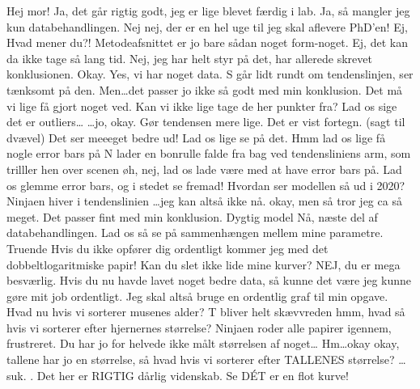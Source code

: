 \documentclass[a4paper,11pt]{article}
\begin{document}
\begin{sketch}
 Hej mor! Ja, det går rigtig godt, jeg er lige blevet færdig i lab. Ja, så mangler jeg kun databehandlingen. 
Nej nej, der er en hel uge til jeg skal aflevere PhD'en! Ej, Hvad mener du?! Metodeafsnittet er jo bare sådan noget form-noget. Ej, det kan da ikke tage så lang tid. 
Nej, jeg har helt styr på det, har allerede skrevet konklusionen.  
 Okay. Yes, vi har noget data. 
\scene S går lidt rundt om tendenslinjen, ser tænksomt på den. 
 Men\ldots det passer jo ikke så godt med min konklusion. Det må vi lige få gjort noget ved. Kan vi ikke lige tage de her punkter fra? Lad os sige det er outliers\ldots
{}\ldots jo, okay. 
\scene Gør tendensen mere lige.
 Det er vist fortegn. (sagt til dvævel) Det ser meeeget bedre ud! Lad os lige se på det. Hmm lad os lige få nogle error bars på
\scene N lader en bonrulle falde fra bag ved tendensliniens arm, som trilller hen over scenen 
 øh, nej, lad os lade være med at have error bars på. \says Lad os glemme error bars, og i stedet se fremad! Hvordan ser modellen så ud i 2020? 
\scene Ninjaen hiver i tendenslinien
 \ldots jeg kan altså ikke nå. 
 okay, men så tror jeg  \says ca så meget. Det passer fint med min konklusion. 
 Dygtig model  Nå, næste del af databehandlingen. Lad os så se på sammenhængen mellem mine parametre. 
Truende Hvis du ikke opfører dig ordentligt kommer jeg med det dobbeltlogaritmiske papir! 
 Kan du slet ikke lide mine kurver? 
 NEJ, du er mega besværlig. 
 Hvis du nu havde lavet noget bedre data, så kunne det være jeg kunne gøre mit job ordentligt.  
  Jeg skal altså bruge en ordentlig graf til min opgave. Hvad nu hvis vi sorterer musenes alder? 
\scene T bliver helt skævvreden
 hmm, hvad så hvis vi sorterer efter hjernernes størrelse?
\scene Ninjaen roder alle papirer igennem, frustreret. 
Du har jo for helvede ikke målt størrelsen af noget\ldots
{} Hm\ldots okay okay, tallene har jo en størrelse, så hvad hvis vi sorterer efter TALLENES størrelse?
\ldots suk. . Det her er RIGTIG dårlig videnskab. 
 Se DÉT er en flot kurve!


\end{sketch}
\end{document}
